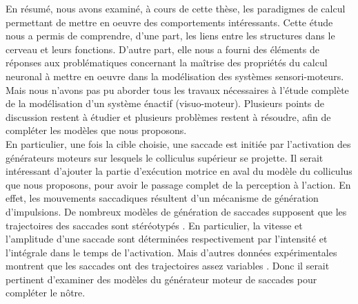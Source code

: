 En résumé, nous avons examiné, à cours de cette thèse, les paradigmes de calcul permettant de mettre en oeuvre des comportements intéressants. Cette étude nous a permis de comprendre, d'une part, les liens entre les structures dans le cerveau et leurs fonctions. D'autre part, elle nous a fourni des éléments de réponses aux problématiques concernant la maîtrise des propriétés du calcul neuronal à mettre en oeuvre dans la modélisation des systèmes sensori-moteurs. Mais nous n'avons pas pu aborder tous les travaux nécessaires à l'étude complète de la modélisation d'un système énactif (visuo-moteur). Plusieurs points de discussion restent à étudier et plusieurs problèmes restent à résoudre, afin de compléter les modèles que nous proposons. \\%

En particulier, une fois la cible choisie, une saccade est initiée par l'activation des générateurs moteurs sur lesquels le colliculus supérieur se projette. Il serait intéressant d'ajouter la partie d'exécution motrice en aval du modèle du colliculus que nous proposons, pour avoir le passage complet de la perception à l'action. En effet, les mouvements saccadiques résultent d'un mécanisme de génération d'impulsions. De nombreux modèles de génération de saccades supposent que les trajectoires des saccades sont stéréotypés \cite{VanGisbergen:1985, Tweed:1985, Grossberg:1986, Scudder:1988, Becker:1990, Moschovakis:1994, Nichols:1995, Quaia:1997, Breznen:1997, Gancarz:1998}. En particulier, la vitesse et l'amplitude d'une saccade sont déterminées respectivement par l'intensité et l'intégrale dans le temps de l'activation. Mais d'autres données expérimentales montrent que les saccades ont des trajectoires assez variables \cite{Erkelens:1995}. Donc il serait pertinent d'examiner des modèles du générateur moteur de saccades pour compléter le nôtre.  \\%

